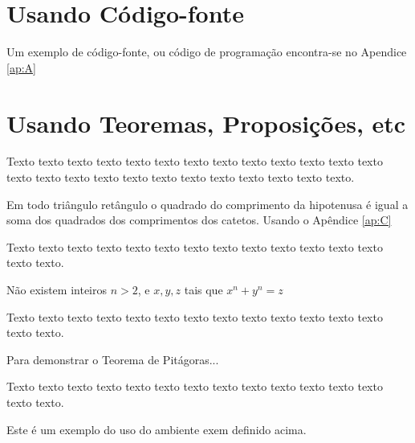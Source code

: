
\section{Usando Código-fonte}

Um exemplo de código-fonte, ou código de programação encontra-se no Apendice \ref{ap:A}

 
\section{Usando Teoremas, Proposições, etc}

 Texto texto texto texto texto texto texto texto texto texto texto texto texto texto texto texto texto texto texto texto texto texto texto texto texto.

\begin{teo}[Pitágoras]
	Em todo triângulo retângulo o quadrado do comprimento da
	hipotenusa é igual a soma dos quadrados dos comprimentos dos catetos. Usando o Apêndice \ref{ap:C}
\end{teo}


Texto texto texto texto texto texto texto texto texto texto texto texto texto texto texto.

\begin{teo}[Fermat]
	Não existem inteiros $n > 2$, e $x, y, z$ tais que $x^n + y^n = z$
\end{teo}

Texto texto texto texto texto texto texto texto texto texto texto texto texto texto texto.

\begin{prop}
	Para demonstrar o Teorema de Pitágoras...
\end{prop}

Texto texto texto texto texto texto texto texto texto texto texto texto texto texto texto.

\begin{exem}
	Este é um exemplo do uso do ambiente exem definido acima.
\end{exem}

